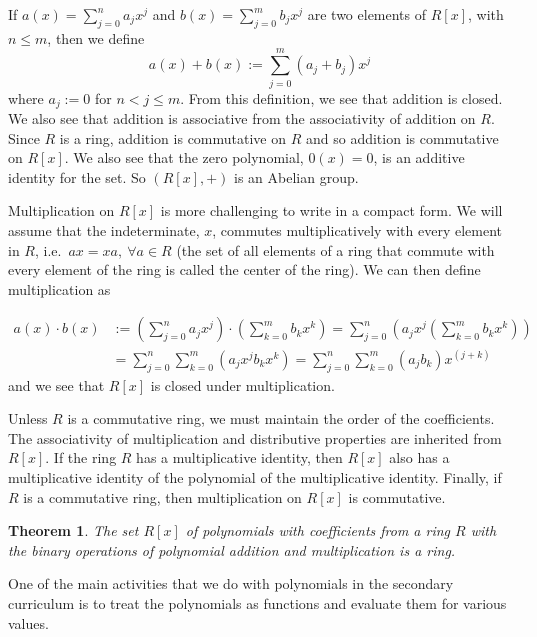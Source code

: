 \documentclass[
]{book}
\newtheorem{theorem}{Theorem}[chapter]
\theoremstyle{definition}
\theoremstyle{definition}
\theoremstyle{definition}
\theoremstyle{remark}
\begin{document}
If \(a(x)=\sum_{j=0}^n a_j x^j\) and \(b(x)=\sum_{j=0}^m b_j x^j\) are two elements of \(R[x]\), with \(n\leq m\), then we define
\[a(x)+b(x) := \sum_{j=0}^m (a_j+b_j) x^j\] where \(a_j:=0\) for \(n<j\leq m\). From this definition, we see that addition is closed. We also see that addition is associative from the associativity of addition on \(R\). Since \(R\) is a ring, addition is commutative on \(R\) and so addition is commutative on \(R[x]\). We also see that the zero polynomial, \(0(x)=0\), is an additive identity for the set. So \((R[x],+)\) is an Abelian group.

Multiplication on \(R[x]\) is more challenging to write in a compact form. We will assume that the indeterminate, \(x\), commutes multiplicatively with every element in \(R\), i.e.~\(ax=xa, \: \forall a\in R\) (the set of all elements of a ring that commute with every element of the ring is called the center of the ring). We can then define multiplication as

\begin{align*}
    a(x) \cdot b(x) &:= \left( \sum_{j=0}^n a_j x^j \right) \cdot \left(\sum_{k=0}^m b_k x^k\right) 
    = \sum_{j=0}^n \left( a_j x^j \left(\sum_{k=0}^m b_k x^k\right) \right) \\
    &= \sum_{j=0}^n \sum_{k=0}^m \left(a_j x^j b_k x^k\right) 
    = \sum_{j=0}^n \sum_{k=0}^m \left(a_j b_k\right) x^{(j+k)}
\end{align*}
and we see that \(R[x]\) is closed under multiplication.

Unless \(R\) is a commutative ring, we must maintain the order of the coefficients. The associativity of multiplication and distributive properties are inherited from \(R[x]\). If the ring \(R\) has a multiplicative identity, then \(R[x]\) also has a multiplicative identity of the polynomial of the multiplicative identity. Finally, if \(R\) is a commutative ring, then multiplication on \(R[x]\) is commutative.

\begin{theorem}
\protect\hypertarget{thm:unnamed-chunk-188}{}{\label{thm:unnamed-chunk-188} }The set \(R[x]\) of polynomials with coefficients from a ring \(R\) with the binary operations of polynomial addition and multiplication is a ring.
\end{theorem}

One of the main activities that we do with polynomials in the secondary curriculum is to treat the polynomials as functions and evaluate them for various values.
\end{document}
